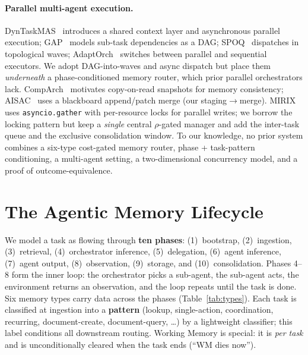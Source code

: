 \documentclass[10pt,twocolumn]{article}
\newcommand{\code}[1]{\texttt{\small #1}}
\begin{document}
\paragraph{Parallel multi-agent execution.} DynTaskMAS~\cite{dyntaskmas}
introduces a shared context layer and asynchronous parallel execution;
GAP~\cite{gap} models sub-task dependencies as a DAG; SPOQ~\cite{spoq} dispatches
in topological waves; AdaptOrch~\cite{adaptorch} switches between parallel and
sequential executors. We adopt DAG-into-waves and async dispatch but place them
\emph{underneath} a phase-conditioned memory router, which prior parallel
orchestrators lack. CompArch~\cite{comparch} motivates copy-on-read snapshots for
memory consistency; AISAC~\cite{aisac} uses a blackboard append/patch merge (our
staging$\to$merge). MIRIX~\cite{mirix} uses \code{asyncio.gather} with
per-resource locks for parallel writes; we borrow the locking pattern but keep a
\emph{single} central $\rho$-gated manager and add the inter-task queue and the
exclusive consolidation window. To our knowledge, no prior system combines a
six-type cost-gated memory router, phase + task-pattern conditioning, a
multi-agent setting, a two-dimensional concurrency model, and a proof of
outcome-equivalence.

\section{The Agentic Memory Lifecycle}\label{sec:lifecycle}
We model a task as flowing through \textbf{ten phases}: (1)~bootstrap,
(2)~ingestion, (3)~retrieval, (4)~orchestrator inference, (5)~delegation,
(6)~agent inference, (7)~agent output, (8)~observation, (9)~storage, and
(10)~consolidation. Phases 4--8 form the inner loop: the orchestrator picks a
sub-agent, the sub-agent acts, the environment returns an observation, and the
loop repeats until the task is done. Six memory types carry data across the
phases (Table~\ref{tab:types}). Each task is classified at ingestion into a
\textbf{pattern} (lookup, single-action, coordination, recurring, document-create,
document-query, \ldots) by a lightweight classifier; this label conditions all
downstream routing. Working Memory is special: it is \emph{per task} and is
unconditionally cleared when the task ends (``WM dies now'').
\end{document}
